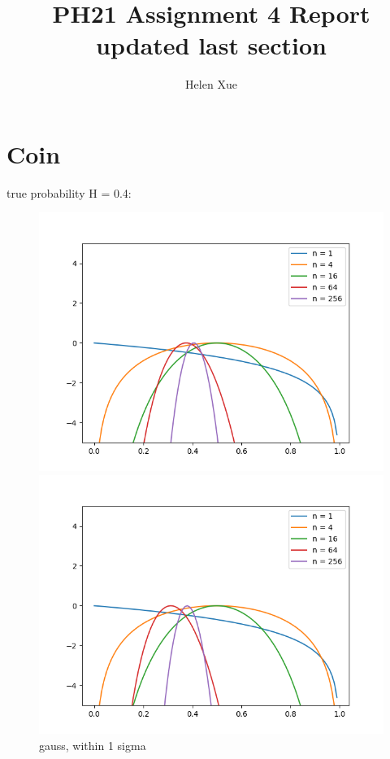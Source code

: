 \documentclass[english]{scrartcl}
\title{PH21 Assignment 4 Report     updated last section}
\author{Helen Xue}
\begin{document}
\maketitle

\section{Coin}
\par true probability H = 0.4:
\begin{figure}[H]
	\includegraphics[width=\linewidth]{coin/h=0.4/gauss_1sigma}
	\caption{gauss, within 1 sigma}  
	\endminipage \hfill
	\includegraphics[width=\linewidth]{coin/h=0.4/gauss_3sigma}

\end{figure}
\end{document}
